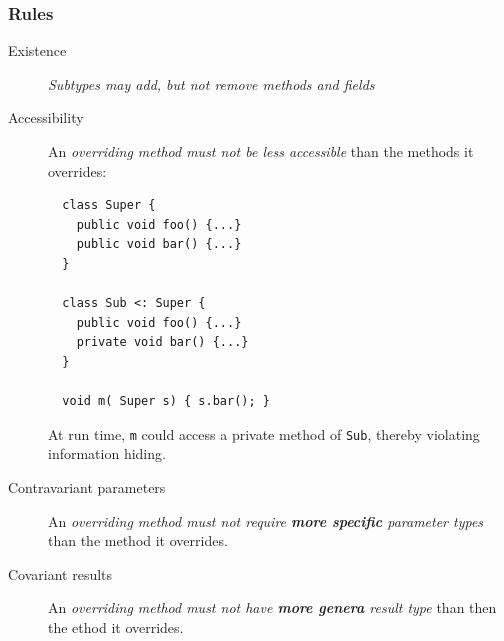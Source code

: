 \subsubsection{Rules}
\begin{description}
 \item[Existence] \emph{Subtypes may add, but not remove methods and fields}
 \item[Accessibility] An \emph{overriding method must not be less accessible} than the methods it overrides:
 \begin{lstlisting}
  class Super {
    public void foo() {...}
    public void bar() {...}
  }
  
  class Sub <: Super {
    public void foo() {...}
    private void bar() {...} 
  }
  
  void m( Super s) { s.bar(); }
 \end{lstlisting}
 At run time, \lstinline{m} could access a private method of \lstinline{Sub}, thereby violating information hiding.
 \item[Contravariant parameters] An \emph{overriding method must not require \textbf{more specific} parameter types} than the method it overrides.
 \item[Covariant results] An \emph{overriding method must not have \textbf{more genera} result type} than then the ethod it overrides. 
\end{description}

